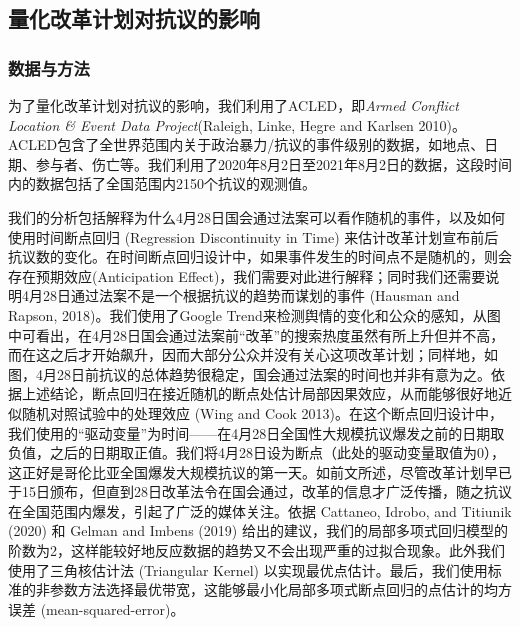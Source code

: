\documentclass{phyasgn}\usepackage{nag}
\begin{document}
\subsection{量化改革计划对抗议的影响}
\subsubsection{数据与方法}
为了量化改革计划对抗议的影响，我们利用了ACLED，即\textit{Armed Conflict Location \& Event Data Project}(Raleigh, Linke, Hegre and Karlsen 2010)。ACLED包含了全世界范围内关于政治暴力/抗议的事件级别的数据，如地点、日期、参与者、伤亡等。我们利用了2020年8月2日至2021年8月2日的数据，这段时间内的数据包括了全国范围内2150个抗议的观测值。
\par 我们的分析包括解释为什么4月28日国会通过法案可以看作随机的事件，以及如何使用时间断点回归 (Regression Discontinuity in Time) 来估计改革计划宣布前后抗议数的变化。在时间断点回归设计中，如果事件发生的时间点不是随机的，则会存在预期效应(Anticipation Effect)，我们需要对此进行解释；同时我们还需要说明4月28日通过法案不是一个根据抗议的趋势而谋划的事件 (Hausman and Rapson, 2018)。我们使用了Google Trend来检测舆情的变化和公众的感知，从图中可看出，在4月28日国会通过法案前“改革”的搜索热度虽然有所上升但并不高，而在这之后才开始飙升，因而大部分公众并没有关心这项改革计划；同样地，如图，4月28日前抗议的总体趋势很稳定，国会通过法案的时间也并非有意为之。依据上述结论，断点回归在接近随机的断点处估计局部因果效应，从而能够很好地近似随机对照试验中的处理效应 (Wing and Cook 2013)。在这个断点回归设计中，我们使用的“驱动变量”为时间——在4月28日全国性大规模抗议爆发之前的日期取负值，之后的日期取正值。我们将4月28日设为断点（此处的驱动变量取值为0），这正好是哥伦比亚全国爆发大规模抗议的第一天。如前文所述，尽管改革计划早已于15日颁布，但直到28日改革法令在国会通过，改革的信息才广泛传播，随之抗议在全国范围内爆发，引起了广泛的媒体关注。依据 Cattaneo, Idrobo, and Titiunik (2020) 和 Gelman and Imbens (2019) 给出的建议，我们的局部多项式回归模型的阶数为2，这样能较好地反应数据的趋势又不会出现严重的过拟合现象。此外我们使用了三角核估计法 (Triangular Kernel) 以实现最优点估计。最后，我们使用标准的非参数方法选择最优带宽，这能够最小化局部多项式断点回归的点估计的均方误差 (mean-squared-error)。
\end{document}

